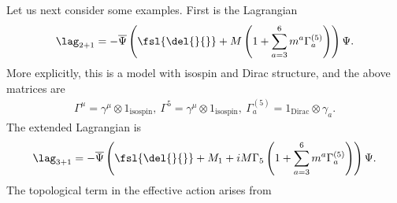 Let us next consider some examples. First is the Lagrangian
\begin{align*}
	\lag_{2 + 1} = -\overline{\Psi}\left(\fsl{\del{}{}} + M\left(1 + \sum\limits_{a = 3}^{6}m^{a}\Gamma_{a}^{(5)}\right)\right)\Psi.
\end{align*}
More explicitly, this is a model with isospin and Dirac structure, and the above matrices are
\begin{align*}
	\Gamma^{\mu} = \gamma^{\mu}\otimes 1_{\text{isospin}},\ \Gamma^{5} = \gamma^{\mu}\otimes 1_{\text{isospin}},\ \Gamma_{a}^{(5)} = 1_{\text{Dirac}}\otimes\gamma_{a}.
\end{align*}
The extended Lagrangian is
\begin{align*}
	\lag_{3 + 1} = -\overline{\Psi}\left(\fsl{\del{}{}} + M_{1} + iM\Gamma_{5}\left(1 + \sum\limits_{a = 3}^{6}m^{a}\Gamma_{a}^{(5)}\right)\right)\Psi.
\end{align*}
The topological term in the effective action arises from
